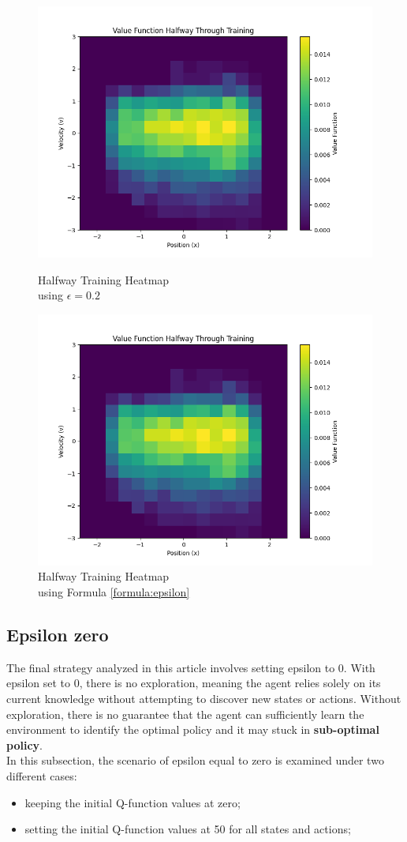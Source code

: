 \documentclass{article}
\begin{document}
\begin{figure}[!htb]
	\begin{minipage}{0.48\textwidth}
		\centering
		\includegraphics[width=0.5\linewidth]{../data/plot/heatmap_halfway_constant_0.2.png}
		\caption{Halfway Training Heatmap  \\ using $\epsilon = 0.2$}
		\label{fig:heatmap_costant_half}
	\end{minipage}\hfill
	\begin{minipage}{0.48\textwidth}
		\centering
		\includegraphics[width=0.5\linewidth]{../data/plot/heatmap_halfway_constant_0.2.png}
		\caption{Halfway Training Heatmap  \\ using Formula \ref{formula:epsilon}}
		\label{fig:heatmap_costant_half}
	\end{minipage}
\end{figure}

\begin{figure}[h]

\end{figure}


\subsection{Epsilon zero}
The final strategy analyzed in this article involves setting epsilon to 0. With epsilon set to 0, there is no exploration, meaning the agent relies solely on its current knowledge without attempting to discover new states or actions. Without exploration, there is no guarantee that the agent can sufficiently learn the environment to identify the optimal policy and it may stuck in \textbf{sub-optimal policy}.\\
In this subsection, the scenario of epsilon equal to zero is examined under two different cases:
\begin{itemize}
	\item keeping the initial Q-function values at zero;
	\item setting the initial Q-function values at 50 for all states and actions;
\end{itemize}
\end{document}
